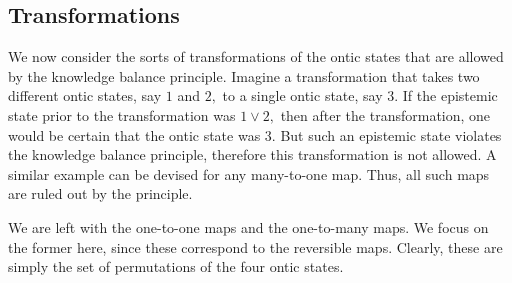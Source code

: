 \documentclass[pra,nofootinbib,showpacs,12pt]{revtex4}
\begin{document}
\subsection{Transformations}

\label{transformations1}

We now consider the sorts of transformations of the ontic states that are
allowed by the knowledge balance principle. Imagine a transformation that
takes two different ontic states, say $1$ and $2,$ to a single ontic state,
say $3$. If the epistemic state prior to the transformation was $1\vee 2,$
then after the transformation, one would be certain that the ontic state was
$3.$ But such an epistemic state violates the knowledge balance principle,
therefore this transformation is not allowed. A similar example can be
devised for any many-to-one map. Thus, all such maps are ruled out by the
principle.

We are left with the one-to-one maps and the one-to-many maps. We focus on
the former here, since these correspond to the reversible maps. Clearly,
these are simply the set of permutations of the four ontic states.
\end{document}
